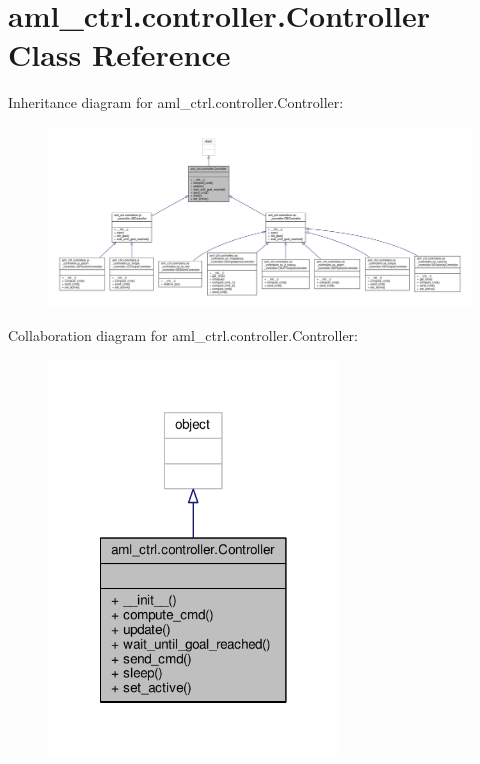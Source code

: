 \hypertarget{classaml__ctrl_1_1controller_1_1_controller}{\section{aml\-\_\-ctrl.\-controller.\-Controller Class Reference}
\label{classaml__ctrl_1_1controller_1_1_controller}
}


Inheritance diagram for aml\-\_\-ctrl.\-controller.\-Controller\-:\nopagebreak
\begin{figure}[H]
\begin{center}
\leavevmode
\includegraphics[width=350pt]{classaml__ctrl_1_1controller_1_1_controller__inherit__graph}
\end{center}
\end{figure}


Collaboration diagram for aml\-\_\-ctrl.\-controller.\-Controller\-:\nopagebreak
\begin{figure}[H]
\begin{center}
\leavevmode
\includegraphics[width=218pt]{classaml__ctrl_1_1controller_1_1_controller__coll__graph}
\end{center}
\end{figure}
